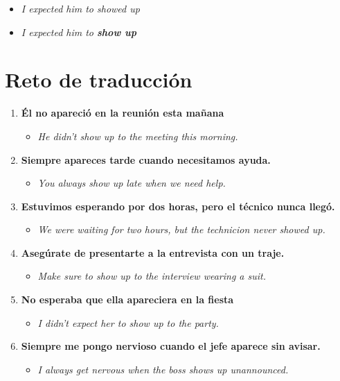 \documentclass[
10pt, %
a4paper, %
oneside, %
headinclude,footinclude, %
BCOR5mm, %
]{scrartcl}
\begin{document}
\begin{itemize}
	\item \textcolor{red}{} \textit{I expected him to showed up}
	\item \textcolor{green}{} \textit{I expected him to \textbf{show up}}
\end{itemize}

\newpage
\section{Reto de traducción}

\begin{enumerate}
	\item \textbf{Él no apareció en la reunión esta mañana}
	\begin{itemize}
		\item \textit{He didn't show up to the meeting this morning.}
	\end{itemize}
	\item \textbf{Siempre apareces tarde cuando necesitamos ayuda.}
	\begin{itemize}
		\item \textit{You always show up late when we need help.}
	\end{itemize}
	\item \textbf{Estuvimos esperando por dos horas, pero el técnico nunca llegó.}
	\begin{itemize}
		\item \textit{We were waiting for two hours, but the technicion never showed up.}
	\end{itemize}
	\item \textbf{Asegúrate de presentarte a la entrevista con un traje.}
	\begin{itemize}
		\item \textit{Make sure to show up to the interview wearing a suit.}
	\end{itemize}
	\item \textbf{No esperaba que ella apareciera en la fiesta}
	\begin{itemize}
		\item \textit{I didn't expect her to show up to the party.}
	\end{itemize}
	\item \textbf{Siempre me pongo nervioso cuando el jefe aparece sin avisar.}
	\begin{itemize}
		\item \textit{I always get nervous when the boss shows up unannounced.}

\end{itemize}
\end{enumerate}
\end{document}
